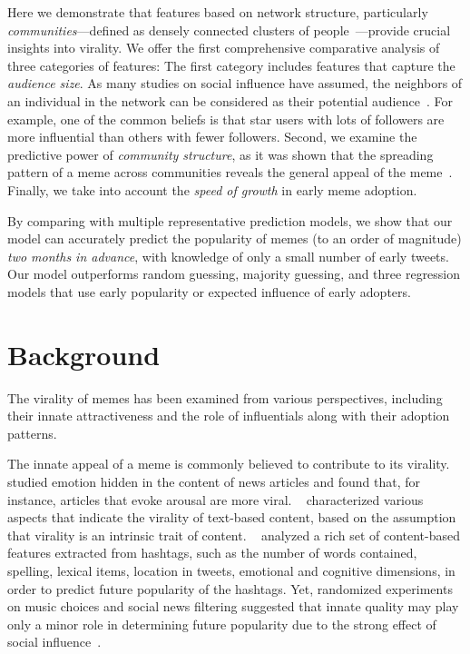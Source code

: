 \documentclass[letterpaper]{article}
\begin{document}
Here we demonstrate that features based on network structure, particularly \emph{communities}---defined as densely connected clusters of people~\cite{fortunato2010community}---provide crucial insights into virality. We offer the first comprehensive comparative analysis of three categories of features: 
The first category includes features that capture the \emph{audience size}. As many studies on social influence have assumed, the neighbors of an individual in the network can be considered as their potential audience~\cite{Kitsak2010kcore,cha2010measuring,Suh2010,bakshy_everyones_2011}.  For example, one of the common beliefs is that star users with lots of followers are more influential than others with fewer followers.
Second, we examine the predictive power of \emph{community structure}, as it was shown that the spreading pattern of a meme across communities reveals the general appeal of the meme~\cite{weng2013viral}.
Finally, we take into account the \emph{speed of growth} in early meme adoption.


By comparing with multiple representative prediction models, we show that our model can accurately predict the popularity of memes (to an order of magnitude) \emph{two months in advance}, with knowledge of only a small number of early tweets. Our model outperforms random guessing, majority guessing, and three regression models that use early popularity or expected influence of early adopters.


\section{Background}


The virality of memes has been examined from various perspectives, including their innate attractiveness and the role of influentials along with their adoption patterns. 


The innate appeal of a meme is commonly believed to contribute to its virality. \citeauthor{Berger:2009viral}~ studied emotion hidden in the content of news articles and found that, for instance, articles that evoke arousal are more viral. \citeauthor{Guerini2011text}~ characterized various aspects that indicate the virality of text-based content, based on the assumption that virality is an intrinsic trait of content. 
\citeauthor{tsur2012wsdm}~ analyzed a rich set of content-based features extracted from hashtags, such as the number of words contained, spelling, lexical items, location in tweets, emotional and cognitive dimensions, in order to predict future popularity of the hashtags.
Yet, randomized experiments on music choices and social news filtering suggested that innate quality may play only a minor role in
determining future popularity due to the strong effect of social influence~\cite{Salganik2006music,muchnik2013}.
\end{document}
